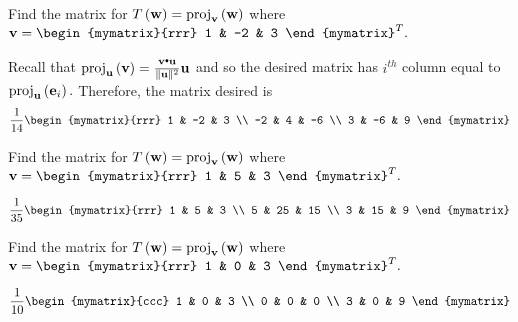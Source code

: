 \begin{enumialphparenastyle}
\begin{ex}  Find the matrix for $T\left({\bf w} \right) = \mbox{proj}_{{\bf v}}\left( {\bf w}\right) $
where $\vect{v}=\begin{mymatrix}{rrr}
1 & -2 & 3
\end{mymatrix} ^{T}.$
\begin{sol}
 Recall that $\func{proj}_{\vect{u}}\left( \vect{v}\right) =\frac{\vect{v}\dotprod\vect{u} }{\vectlength \vect{u}\vectlength ^{2}}\vect{u}$ and so the desired matrix
has $i^{th}$ column equal to $\mbox{proj}_{{\bf u}}\left( {\bf e}_{i}\right) .$ Therefore, the matrix desired is
\[
\frac{1}{14}\begin{mymatrix}{rrr}
1 & -2 & 3 \\
-2 & 4 & -6 \\
3 & -6 & 9
\end{mymatrix}
\]
\end{sol}
\end{ex}

\begin{ex}  Find the matrix for $T\left({\bf w} \right) = \mbox{proj}_{{\bf v}}\left( {\bf w}\right) $
where $\vect{v}=\begin{mymatrix}{rrr}
1 & 5 & 3
\end{mymatrix} ^{T}.$
\begin{sol}
\[
\frac{1}{35}\begin{mymatrix}{rrr}
1 & 5 & 3 \\
5 & 25 & 15 \\
3 & 15 & 9
\end{mymatrix}
\]
\end{sol}
\end{ex}

\begin{ex} Find the matrix for $T\left({\bf w} \right) = \mbox{proj}_{{\bf v}}\left( {\bf w}\right) $
where $\vect{v}=\begin{mymatrix}{rrr}
1 & 0 & 3
\end{mymatrix} ^{T}.$ 
\begin{sol}
\[
\frac{1}{10}\begin{mymatrix}{ccc}
1 & 0 & 3 \\
0 & 0 & 0 \\
3 & 0 & 9
\end{mymatrix}
\]
\end{sol}
\end{ex}

\end{enumialphparenastyle}
